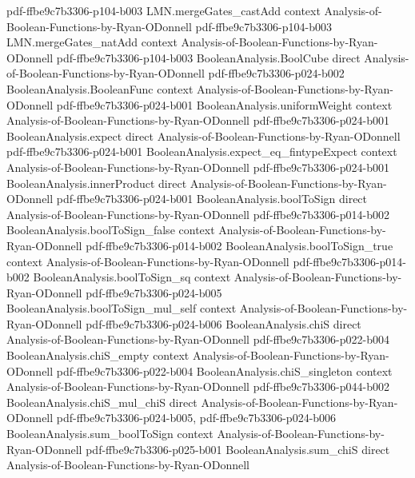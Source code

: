 \begin{theorem}
  {pdf-ffbe9c7b3306-p104-b003}
\proofstep
  {LMN.mergeGates_castAdd}
  {context}
  {Analysis-of-Boolean-Functions-by-Ryan-ODonnell}
  {pdf-ffbe9c7b3306-p104-b003}
\proofstep
  {LMN.mergeGates_natAdd}
  {context}
  {Analysis-of-Boolean-Functions-by-Ryan-ODonnell}
  {pdf-ffbe9c7b3306-p104-b003}
\proofstep
  {BooleanAnalysis.BoolCube}
  {direct}
  {Analysis-of-Boolean-Functions-by-Ryan-ODonnell}
  {pdf-ffbe9c7b3306-p024-b002}
\proofstep
  {BooleanAnalysis.BooleanFunc}
  {context}
  {Analysis-of-Boolean-Functions-by-Ryan-ODonnell}
  {pdf-ffbe9c7b3306-p024-b001}
\proofstep
  {BooleanAnalysis.uniformWeight}
  {context}
  {Analysis-of-Boolean-Functions-by-Ryan-ODonnell}
  {pdf-ffbe9c7b3306-p024-b001}
\proofstep
  {BooleanAnalysis.expect}
  {direct}
  {Analysis-of-Boolean-Functions-by-Ryan-ODonnell}
  {pdf-ffbe9c7b3306-p024-b001}
\proofstep
  {BooleanAnalysis.expect_eq_fintypeExpect}
  {context}
  {Analysis-of-Boolean-Functions-by-Ryan-ODonnell}
  {pdf-ffbe9c7b3306-p024-b001}
\proofstep
  {BooleanAnalysis.innerProduct}
  {direct}
  {Analysis-of-Boolean-Functions-by-Ryan-ODonnell}
  {pdf-ffbe9c7b3306-p024-b001}
\proofstep
  {BooleanAnalysis.boolToSign}
  {direct}
  {Analysis-of-Boolean-Functions-by-Ryan-ODonnell}
  {pdf-ffbe9c7b3306-p014-b002}
\proofstep
  {BooleanAnalysis.boolToSign_false}
  {context}
  {Analysis-of-Boolean-Functions-by-Ryan-ODonnell}
  {pdf-ffbe9c7b3306-p014-b002}
\proofstep
  {BooleanAnalysis.boolToSign_true}
  {context}
  {Analysis-of-Boolean-Functions-by-Ryan-ODonnell}
  {pdf-ffbe9c7b3306-p014-b002}
\proofstep
  {BooleanAnalysis.boolToSign_sq}
  {context}
  {Analysis-of-Boolean-Functions-by-Ryan-ODonnell}
  {pdf-ffbe9c7b3306-p024-b005}
\proofstep
  {BooleanAnalysis.boolToSign_mul_self}
  {context}
  {Analysis-of-Boolean-Functions-by-Ryan-ODonnell}
  {pdf-ffbe9c7b3306-p024-b006}
\proofstep
  {BooleanAnalysis.chiS}
  {direct}
  {Analysis-of-Boolean-Functions-by-Ryan-ODonnell}
  {pdf-ffbe9c7b3306-p022-b004}
\proofstep
  {BooleanAnalysis.chiS_empty}
  {context}
  {Analysis-of-Boolean-Functions-by-Ryan-ODonnell}
  {pdf-ffbe9c7b3306-p022-b004}
\proofstep
  {BooleanAnalysis.chiS_singleton}
  {context}
  {Analysis-of-Boolean-Functions-by-Ryan-ODonnell}
  {pdf-ffbe9c7b3306-p044-b002}
\proofstep
  {BooleanAnalysis.chiS_mul_chiS}
  {direct}
  {Analysis-of-Boolean-Functions-by-Ryan-ODonnell}
  {pdf-ffbe9c7b3306-p024-b005,
    pdf-ffbe9c7b3306-p024-b006}
\proofstep
  {BooleanAnalysis.sum_boolToSign}
  {context}
  {Analysis-of-Boolean-Functions-by-Ryan-ODonnell}
  {pdf-ffbe9c7b3306-p025-b001}
\proofstep
  {BooleanAnalysis.sum_chiS}
  {direct}
  {Analysis-of-Boolean-Functions-by-Ryan-ODonnell}

\end{theorem}

